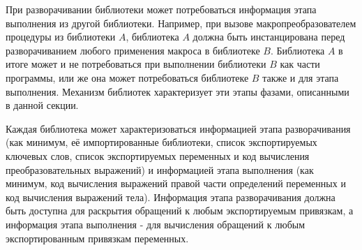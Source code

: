 При разворачивании библиотеки может потребоваться информация этапа выполнения из другой
библиотеки. Например, при вызове макропреобразователем процедуры из библиотеки $A$, библиотека
$A$ должна быть инстанцирована перед разворачиванием любого применения макроса в библиотеке
$B$. Библиотека $A$ в итоге может и не потребоваться при выполнении библиотеки $B$ как части
программы, или же она может потребоваться библиотеке $B$ также и для этапа выполнения.
Механизм библиотек характеризует эти этапы фазами, описанными в данной секции.\vspace{-1.2mm}

Каждая библиотека может характеризоваться информацией этапа разворачивания (как минимум, её
импортированные библиотеки, список экспортируемых ключевых слов, список экспортируемых
переменных и код вычисления преобразовательных выражений) и информацией этапа выполнения
(как минимум, код вычисления выражений правой части определений переменных и код
вычисления выражений тела). Информация этапа разворачивания должна быть доступна для раскрытия
обращений к любым экспортируемым привязкам, а информация этапа выполнения -
для вычисления обращений к любым экспортированным привязкам переменных.\vspace{-1.2mm}

